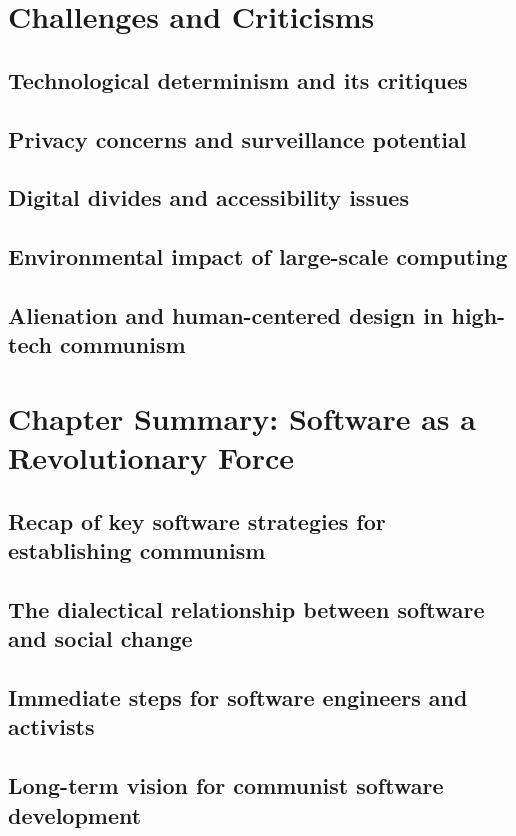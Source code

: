 \newpage

\section{Challenges and Criticisms}
\subsection{Technological determinism and its critiques}
\subsection{Privacy concerns and surveillance potential}
\subsection{Digital divides and accessibility issues}
\subsection{Environmental impact of large-scale computing}
\subsection{Alienation and human-centered design in high-tech communism}

\newpage

\section{Chapter Summary: Software as a Revolutionary Force}
\subsection{Recap of key software strategies for establishing communism}
\subsection{The dialectical relationship between software and social change}
\subsection{Immediate steps for software engineers and activists}
\subsection{Long-term vision for communist software development}